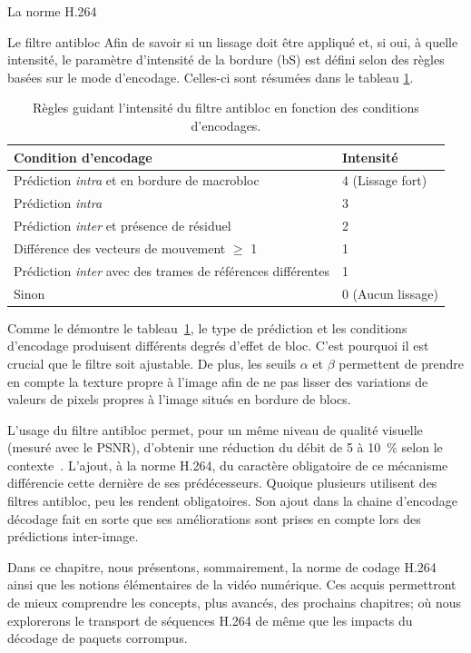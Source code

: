 \begin{chapter}{La norme H.264}
\begin{section}{Le filtre antibloc}
Afin de savoir si un lissage doit être appliqué et, si oui, à quelle
intensité, le paramètre d'intensité de la bordure (bS) est défini selon des
règles basées sur le mode d'encodage. Celles-ci sont résumées dans le tableau
\ref{tab-FilteringRules}.

\begin{table}
\caption[Règles guidant l'intensité du filtre antibloc]{Règles guidant
l'intensité du filtre antibloc en fonction des conditions d'encodages.}
\label{tab-FilteringRules}
\centering
\begin{tabular}{| l | l | }
\hline
\textbf{Condition d'encodage} & \textbf{Intensité} \\
\hline
Prédiction \textit{intra} et en bordure de macrobloc & 4 (Lissage fort)\\
\hline
Prédiction \textit{intra} & 3 \\
\hline
Prédiction \textit{inter} et présence de résiduel & 2 \\
\hline
Différence des vecteurs de mouvement $\geqslant$ 1 & 1 \\
\hline
Prédiction \textit{inter} avec des trames de références différentes& 1 \\
\hline
Sinon & 0 (Aucun lissage) \\
\hline
\end{tabular}
\end{table}

Comme le démontre le tableau~\ref{tab-FilteringRules}, le type de
prédiction et les conditions d'encodage produisent différents degrés d'effet
de bloc. C'est pourquoi il est crucial que le filtre soit ajustable. De plus,
les seuils $\alpha$ et $\beta$ permettent de prendre en compte la texture propre
à l'image afin de ne pas lisser des variations de valeurs de pixels propres à
l'image situés en bordure de blocs.

L'usage du filtre antibloc permet, pour un même niveau de qualité visuelle
(mesuré avec le PSNR), d'obtenir une réduction du débit de 5 à 10~\% selon le
contexte~\citep{list2003}. L'ajout, à la norme H.264, du caractère obligatoire
de ce mécanisme différencie cette dernière de ses prédécesseurs. Quoique
plusieurs utilisent des filtres antibloc, peu les rendent obligatoires. Son
ajout dans la chaine d'encodage décodage fait en sorte que ses améliorations
sont prises en compte lors des prédictions inter-image.
\end{section}

Dans ce chapitre, nous présentons, sommairement, la norme de codage H.264 ainsi
que les notions élémentaires de la vidéo numérique. Ces acquis permettront de
mieux comprendre les concepts, plus avancés, des prochains chapitres; où nous
explorerons le transport de séquences H.264 de même que les impacts du décodage
de paquets corrompus.


\end{chapter}
